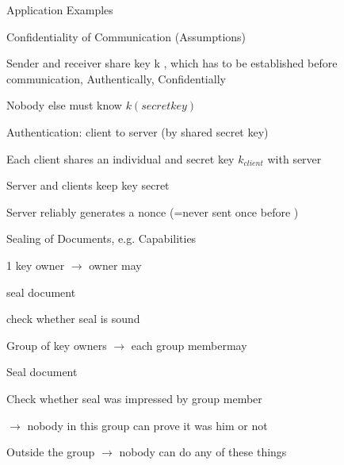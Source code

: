 \documentclass[a4paper]{article}
\begin{document}
\begin{multicols}{3}
    Application Examples
    \begin{enumerate*}
        \item Confidentiality of Communication (Assumptions)
        \begin{itemize*}
            \item Sender and receiver share key k , which has to be established before communication, Authentically, Confidentially
            \item Nobody else must know $k(secretkey)$
        \end{itemize*}
        \item Authentication: client to server (by shared secret key)
        \begin{itemize*}
            \item Each client shares an individual and secret key $k_{client}$ with server
            \item Server and clients keep key secret
            \item Server reliably generates a nonce (=never sent once before )
        \end{itemize*}
        \item Sealing of Documents, e.g. Capabilities
        \begin{itemize*}
            \item 1 key owner $\rightarrow$ owner may
            \begin{itemize*}
                \item seal document
                \item check whether seal is sound
            \end{itemize*}
            \item Group of key owners $\rightarrow$ each group membermay
            \begin{itemize*}
                \item Seal document
                \item Check whether seal was impressed by group member
                \item[$\rightarrow$] nobody in this group can prove it was him or not
            \end{itemize*}
            \item Outside the group $\rightarrow$ nobody can do any of these things
        \end{itemize*}
    \end{enumerate*}


\end{multicols}
\end{document}
